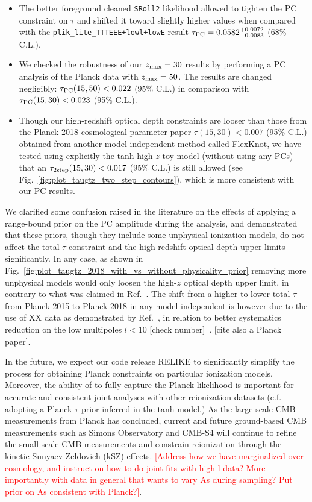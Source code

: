 \documentclass[prd,twocolumn,amsmath,amssymb,floatfix,superscriptaddress,nofootinbib]{revtex4-1}
\newcommand{\zmax}{z_{\rm max}}
\newcommand{\ch}[1]{\textcolor{red}{#1}}
\begin{document}
{\begin{itemize}
    \item {The better foreground cleaned \texttt{SRoll2} likelihood allowed to tighten the PC constraint on $\tau$ and shifted it toward slightly higher values when compared with the \texttt{plik\_lite\_TTTEEE+lowl+lowE} result  $\tau_{\rm PC} = 0.0582 ^{+0.0072}_{-0.0083}$ (68\% C.L.).}
    
    \item {We checked the robustness of our $\zmax=30$ results by performing a PC analysis of the Planck data with $\zmax = 50$. The results are changed negligibly: $\tau_{\rm PC}(15, 50) < 0.022 $ (95\% C.L.) in comparison with $\tau_{\rm PC}(15, 30) < 0.023$ (95\% C.L.).}
    
     \item {Though our high-redshift optical depth constraints are looser than those from the Planck 2018 cosmological parameter paper $\tau(15, 30) < 0.007$ (95\% C.L.) obtained from another model-independent method called FlexKnot, we have tested using explicitly the tanh high-$z$ toy model (without using any PCs) that an $\tau_{\rm 2step}(15, 30) < 0.017$ (95\% C.L.) is still allowed (see Fig.~\ref{fig:plot_taugtz_two_step_contours}), which is more consistent with our PC results.}
     
\end{itemize}

We clarified some confusion raised in the literature on the effects of applying a range-bound prior on the PC amplitude during the analysis, and demonstrated that these priors, though they include some unphysical ionization models, do not affect the total $\tau$ constraint and the high-redshift optical depth upper limits significantly. In any case, as shown in Fig.~\ref{fig:plot_taugtz_2018_with_vs_without_physicality_prior} removing more unphysical models would only loosen the high-$z$ optical depth upper limit, in contrary to what was claimed in Ref.~\cite{Millea:2018bko}. The shift from a higher to lower total $\tau$ from Planck 2015 to Planck 2018 in any model-independent is however due to the use of XX data as demonstrated by Ref.~\cite{Millea:2018bko}, in relation to better systematics reduction on the low multipoles $l<10$ [check number]~\cite{Heinrich:2018btc}. [cite also a Planck paper].

In the future, we expect our code release RELIKE to significantly simplify the process for obtaining Planck constraints on particular ionization models. 
Moreover, the ability of  to fully capture the Planck likelihood is important for accurate and consistent joint analyses with other reionization datasets (c.f. adopting a Planck $\tau$ prior inferred in the tanh model.) As the large-scale CMB measurements from Planck has concluded, current and future ground-based CMB measurements such as Simons Observatory and CMB-S4 will continue to refine the small-scale CMB measurements and constrain reionization through the kinetic Sunyaev-Zeldovich (kSZ) effects. \ch{[Address how we have marginalized over cosmology, and instruct on how to do joint fits with high-l data? More importantly with data in general that wants to vary As during sampling? Put prior on As consistent with Planck?]}. 

}
\end{document}
